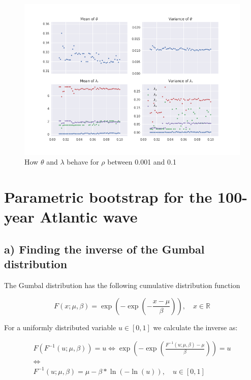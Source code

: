 \documentclass[a4paper]{article}
\begin{document}
\begin{figure}[H]
    \centering
    \includegraphics[width = 1.0\textwidth]{images/rhos_theta.png}
    \caption{How $\theta$ and $\lambda$ behave for $\rho$ between 0.001 and 0.1}
    \label{fig:thetha_rho}
\end{figure}

\newpage

\section{Parametric bootstrap for the 100-year Atlantic wave}

\subsection*{a) Finding the inverse of the Gumbal distribution}

The Gumbal distribution has the following cumulative distribution function

\begin{equation}
    F(x; \mu, \beta) = \exp\left(-\exp\left(-\frac{x-\mu}{\beta}\right)\right), \quad x \in \mathbb{R}
    \label{eq:gumbel}
\end{equation}

For a uniformly distributed variable $u \in [0,1]$ we calculate the inverse as:

\begin{equation}
    \label{eq:inv_gumbel}
    \begin{gathered}
        F(F^{-1}(u;\mu, \beta)) = u \iff \exp(-\exp(\frac{F^{-1}(u;\mu,\beta)-\mu}{\beta})) = u \\
        \iff \\
        F^{-1}(u; \mu, \beta) = \mu - \beta*\ln(-\ln(u)), \quad u\in [0,1]
    \end{gathered}
\end{equation}
\end{document}
